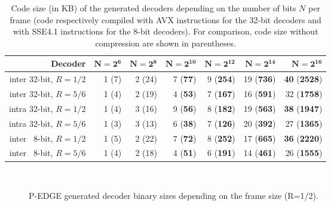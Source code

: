 \begin{table}[htp]
  \begin{center}
  \begin{tabular}{r r r r r r r}
    \textbf{Decoder}         & $\bm{N = 2^6}$ & $\bm{N = 2^8}$ & $\bm{N = 2^{10}}$ & $\bm{N = 2^{12}}$ & $\bm{N = 2^{14}}$ & $\bm{N = 2^{16}}$           \\
    \hline
    \hline
    inter 32-bit, $R = 1/2$  & 1 (7)          & 2 (24)         & 7 (\textbf{77})   & 9 (\textbf{254})  & 19 (\textbf{736}) & \textbf{40} (\textbf{2528}) \\
    inter 32-bit, $R = 5/6$  & 1 (4)          & 2 (19)         & 4 (\textbf{53})   & 7 (\textbf{167})  & 16 (\textbf{591}) & 32          (\textbf{1758}) \\
    intra 32-bit, $R = 1/2$  & 1 (4)          & 3 (16)         & 9 (\textbf{56})   & 8 (\textbf{182})  & 19 (\textbf{563}) & \textbf{38} (\textbf{1947}) \\
    intra 32-bit, $R = 5/6$  & 1 (3)          & 3 (13)         & 6 (\textbf{38})   & 7 (\textbf{126})  & 20 (\textbf{392}) & 27          (\textbf{1365}) \\
    inter ~8-bit, $R = 1/2$  & 1 (5)          & 2 (22)         & 7 (\textbf{72})   & 8 (\textbf{252})  & 17 (\textbf{665}) & \textbf{36} (\textbf{2220}) \\
    inter ~8-bit, $R = 5/6$  & 1 (4)          & 2 (18)         & 4 (\textbf{51})   & 6 (\textbf{191})  & 14 (\textbf{461}) & 26          (\textbf{1555}) \\
  \end{tabular}
  \end{center}
  \caption{Code size (in KB) of the generated decoders depending on the number
    of bits $N$ per frame (code respectively compiled with AVX instructions for
    the 32-bit decoders and with SSE4.1 instructions for the 8-bit decoders).
    For comparison, code size without compression are shown in parentheses.}
  \label{tab:eval_polar_sc_gen_l1i_size}
\end{table}

\begin{figure}[htp]
  \centering
  \\
  \caption{P-EDGE generated decoder binary sizes depending on the frame size
    (R=1/2).}
  \label{plot:eval_polar_sc_gen_l1i_size}
\end{figure}

